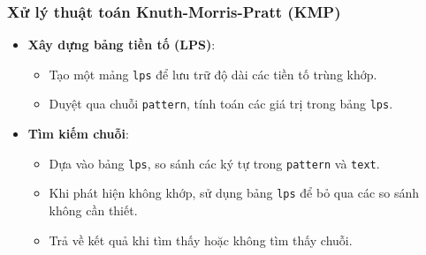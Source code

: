 \subsubsection{Xử lý thuật toán Knuth-Morris-Pratt (KMP)}
\begin{itemize}
    \item \textbf{Xây dựng bảng tiền tố (LPS)}:
    \begin{itemize}
        \item Tạo một mảng \texttt{lps} để lưu trữ độ dài các tiền tố trùng khớp.
        \item Duyệt qua chuỗi \texttt{pattern}, tính toán các giá trị trong bảng \texttt{lps}.
    \end{itemize}
    \item \textbf{Tìm kiếm chuỗi}:
    \begin{itemize}
        \item Dựa vào bảng \texttt{lps}, so sánh các ký tự trong \texttt{pattern} và \texttt{text}.
        \item Khi phát hiện không khớp, sử dụng bảng \texttt{lps} để bỏ qua các so sánh không cần thiết.
        \item Trả về kết quả khi tìm thấy hoặc không tìm thấy chuỗi.
    \end{itemize}
\end{itemize}

